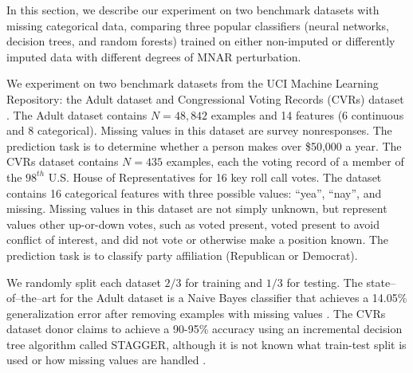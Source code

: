 \documentclass[10pt]{book}
\theoremstyle{definition}
\begin{document}
\par


\setcounter{chapter}{3}
\setcounter{equation}{0} %

In this section, we describe our experiment on two benchmark datasets with missing categorical data, comparing three popular classifiers (neural networks, decision trees, and random forests) trained on either non-imputed or differently imputed data with different degrees of MNAR perturbation.

\par
{}

We experiment on two benchmark datasets from the UCI Machine Learning Repository: the Adult dataset and Congressional Voting Records (CVRs) dataset \citep{Lichman2013}. The Adult dataset contains $N=48,842$ examples and 14 features (6 continuous and 8 categorical). Missing values in this dataset are survey nonresponses. The prediction task is to determine whether a person makes over \$50,000 a year. The CVRs dataset contains $N=435$ examples, each the voting record of a member of the $98^{th}$ U.S. House of Representatives for 16 key roll call votes. The dataset contains 16 categorical features with three possible values: ``yea'', ``nay'', and missing. Missing values in this dataset are not simply unknown, but represent values other up-or-down votes, such as voted present, voted present to avoid conflict of interest, and did not vote or otherwise make a position known. The prediction task is to classify party affiliation (Republican or Democrat). 

We randomly split each dataset $2/3$ for training and $1/3$ for testing. The state--of--the--art for the Adult dataset is a Naive Bayes classifier that achieves a 14.05\% generalization error after removing examples with missing values \citep{kohavi1996}. The CVRs dataset donor claims to achieve a 90-95\% accuracy using an incremental decision tree algorithm called STAGGER, although it is not known what train-test split is used or how missing values are handled \citep{schlimmer1987,schlimmer1986}.

\par
{}
\end{document}
